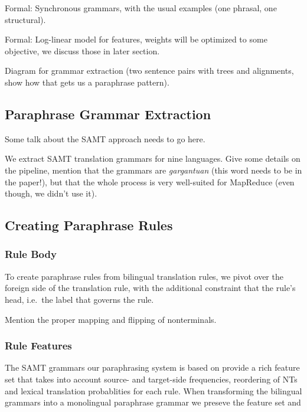 \documentclass[11pt]{article}
\begin{document}
Formal: Synchronous grammars, with the usual examples (one phrasal, one
structural).

Formal: Log-linear model for features, weights will be optimized to some
objective, we discuss those in later section.

Diagram for grammar extraction (two sentence pairs with trees and
alignments, show how that gets us a paraphrase pattern). 



\subsection{Paraphrase Grammar Extraction} \label{extraction}

Some talk about the SAMT approach needs to go here. 

We extract SAMT translation grammars for nine languages. Give some
details on the pipeline, mention that the grammars are
\emph{gargantuan} (this word needs to be in the paper!), but that the
whole process is very well-suited for MapReduce (even though, we
didn't use it).

\subsection{Creating Paraphrase Rules} \label{rule_creation}

\subsubsection{Rule Body} \label{rule_body}

To create paraphrase rules from bilingual translation rules, we pivot
over the foreign side of the translation rule, with the additional
constraint that the rule's head, i.e.\ the label that governs the
rule.

Mention the proper mapping and flipping of nonterminals.

\subsubsection{Rule Features} \label{rule_features}

The SAMT grammars our paraphrasing system is based on provide a rich
feature set that takes into account source- and target-side
frequencies, reordering of NTs and lexical translation probablities
for each rule. When transforming the bilingual grammars into a
monolingual paraphrase grammar we preseve the feature set and
\end{document}
